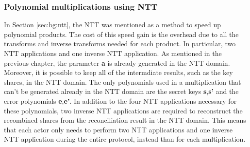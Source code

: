 \subsubsection{Polynomial multiplications using NTT}\label{sec:nh:ntt}
In Section \ref{sec:bg:ntt}, the NTT was mentioned as a method to speed up polynomial products. The cost of this speed gain is the overhead due to all the transforms and inverse transforms needed for each product. In particular, two NTT applications and one inverse NTT application. As mentioned in the previous chapter, the parameter \textbf{a} is already generated in the NTT domain. Moreover, it is possible to keep all of the intermdiate results, such as the key shares, in the NTT domain. The only polynomials used in a multiplication that can't be generated already in the NTT domain are the secret keys \textbf{s},\textbf{s'} and the error polynomials \textbf{e},\textbf{e'}. In addition to the four NTT applications necessary for these polynomials, two inverse NTT applications are required to reconstruct the recombined shares from the reconciliation result in the NTT domain. This means that each actor only needs to perform two NTT applications and one inverse NTT application during the entire protocol, instead than for each multiplication.

